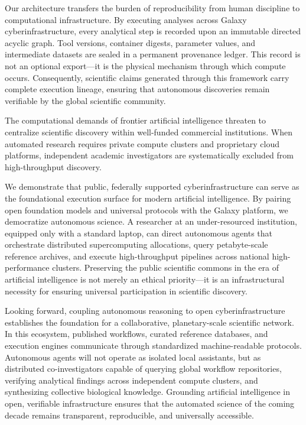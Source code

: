 \documentclass[11pt,letterpaper]{article}
\begin{document}
Our architecture transfers the burden of reproducibility from human discipline to computational infrastructure. By executing analyses across Galaxy cyberinfrastructure, every analytical step is recorded upon an immutable directed acyclic graph. Tool versions, container digests, parameter values, and intermediate datasets are sealed in a permanent provenance ledger. This record is not an optional export---it is the physical mechanism through which compute occurs. Consequently, scientific claims generated through this framework carry complete execution lineage, ensuring that autonomous discoveries remain verifiable by the global scientific community.

The computational demands of frontier artificial intelligence threaten to centralize scientific discovery within well-funded commercial institutions. When automated research requires private compute clusters and proprietary cloud platforms, independent academic investigators are systematically excluded from high-throughput discovery.

We demonstrate that public, federally supported cyberinfrastructure can serve as the foundational execution surface for modern artificial intelligence. By pairing open foundation models and universal protocols with the Galaxy platform, we democratize autonomous science. A researcher at an under-resourced institution, equipped only with a standard laptop, can direct autonomous agents that orchestrate distributed supercomputing allocations, query petabyte-scale reference archives, and execute high-throughput pipelines across national high-performance clusters. Preserving the public scientific commons in the era of artificial intelligence is not merely an ethical priority---it is an infrastructural necessity for ensuring universal participation in scientific discovery.

Looking forward, coupling autonomous reasoning to open cyberinfrastructure establishes the foundation for a collaborative, planetary-scale scientific network. In this ecosystem, published workflows, curated reference databases, and execution engines communicate through standardized machine-readable protocols. Autonomous agents will not operate as isolated local assistants, but as distributed co-investigators capable of querying global workflow repositories, verifying analytical findings across independent compute clusters, and synthesizing collective biological knowledge. Grounding artificial intelligence in open, verifiable infrastructure ensures that the automated science of the coming decade remains transparent, reproducible, and universally accessible.
\end{document}
